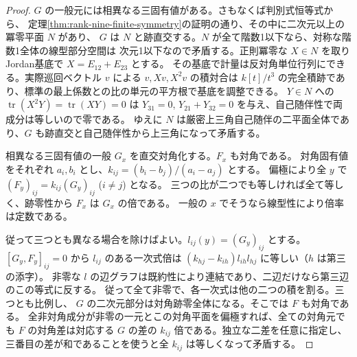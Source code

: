 \begin{proof}
$G$ の一般元には相異なる三固有値がある。さもなくば判別式恒等式から、
定理\ref{thm:rank-nine-finite-symmetry}の証明の通り、その中に二次元以上の冪零平面 $N$ があり、
$G$ は $N$ と跡直交する。$N$ が全て階数1以下なら、対称な階数1全体の線型部分空間は
次元1以下なので矛盾する。正則冪零な $X\in N$ を取りJordan基底で $X=E_{12}+E_{23}$ とする。
その基底で計量は反対角単位行列にできる。実際巡回ベクトル $v$ による
$v,Xv,X^2v$ の積対合は $k[t]/t^3$ の完全積跡であり、標準の最上係数との比の単元の平方根で基底を調整できる。
$Y\in N$ への $\operatorname{tr}(X^2Y)=\operatorname{tr}(XY)=0$ は
$Y_{31}=0$, $Y_{21}+Y_{32}=0$ を与え、自己随伴性で両成分は等しいので零である。
ゆえに $N$ は厳密上三角自己随伴の二平面全体であり、$G$ も跡直交と自己随伴性から上三角になって矛盾する。

相異なる三固有値の一般 $G_x$ を直交対角化する。$F_x$ も対角である。
対角固有値をそれぞれ $a_i,b_i$ とし、$k_{ij}=(b_i-b_j)/(a_i-a_j)$ とする。
偏極により全 $y$ で $(F_y)_{ij}=k_{ij}(G_y)_{ij}$ ($i\ne j$) となる。
三つの比が二つでも等しければ全て等しく、跡零性から $F_x$ は $G_x$ の倍である。
一般の $x$ でそうなら線型性により倍率は定数である。

従って三つとも異なる場合を除けばよい。$l_{ij}(y)=(G_y)_{ij}$ とする。
$[G_y,F_y]_{ij}=0$ から $l_{ij}$ のある一次式倍は
$(k_{hj}-k_{ih})l_{ih}l_{hj}$ に等しい（$h$ は第三の添字）。
非零な $l$ の辺グラフは既約性により連結であり、二辺だけなら第三辺のこの等式に反する。
従って全て非零で、各一次式は他の二つの積を割る。三つとも比例し、
$G$ の二次元部分は対角跡零全体になる。そこでは $F$ も対角である。
全非対角成分が非零の一元とこの対角平面を偏極すれば、全ての対角元でも
$F$ の対角差は対応する $G$ の差の $k_{ij}$ 倍である。独立な二差を任意に指定し、
三番目の差が和であることを使うと全 $k_{ij}$ は等しくなって矛盾する。
\end{proof}
